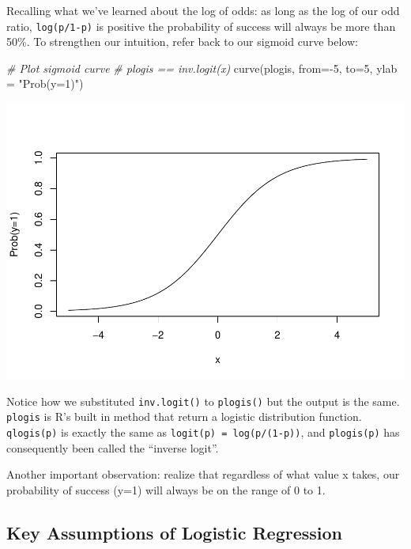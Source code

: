 \documentclass[
]{article}
\newenvironment{Shaded}{\begin{snugshade}}{\end{snugshade}}
\newcommand{\AttributeTok}[1]{\textcolor[rgb]{0.77,0.63,0.00}{#1}}
\newcommand{\CommentTok}[1]{\textcolor[rgb]{0.56,0.35,0.01}{\textit{#1}}}
\newcommand{\DecValTok}[1]{\textcolor[rgb]{0.00,0.00,0.81}{#1}}
\newcommand{\FunctionTok}[1]{\textcolor[rgb]{0.00,0.00,0.00}{#1}}
\newcommand{\NormalTok}[1]{#1}
\newcommand{\SpecialCharTok}[1]{\textcolor[rgb]{0.00,0.00,0.00}{#1}}
\newcommand{\StringTok}[1]{\textcolor[rgb]{0.31,0.60,0.02}{#1}}
\begin{document}
Recalling what we've learned about the log of odds: as long as the log
of our odd ratio, \texttt{log(p/1-p)} is positive the probability of
success will always be more than 50\%. To strengthen our intuition,
refer back to our sigmoid curve below:

\begin{Shaded}
\begin{Highlighting}[]
\CommentTok{\# Plot sigmoid curve}
\CommentTok{\# plogis == inv.logit(x)}
\FunctionTok{curve}\NormalTok{(plogis, }\AttributeTok{from=}\SpecialCharTok{{-}}\DecValTok{5}\NormalTok{, }\AttributeTok{to=}\DecValTok{5}\NormalTok{, }\AttributeTok{ylab =} \StringTok{"Prob(y=1)"}\NormalTok{)}
\end{Highlighting}
\end{Shaded}

\includegraphics{classification1_files/figure-latex/unnamed-chunk-9-1.pdf}

Notice how we substituted \texttt{inv.logit()} to \texttt{plogis()} but
the output is the same. \texttt{plogis} is R's built in method that
return a logistic distribution function. \texttt{qlogis(p)} is exactly
the same as \texttt{logit(p)\ =\ log(p/(1-p))}, and \texttt{plogis(p)}
has consequently been called the ``inverse logit''.

Another important observation: realize that regardless of what value x
takes, our probability of success (y=1) will always be on the range of 0
to 1.

\hypertarget{key-assumptions-of-logistic-regression}{%
\subsection{Key Assumptions of Logistic
Regression}\label{key-assumptions-of-logistic-regression}}
\end{document}
